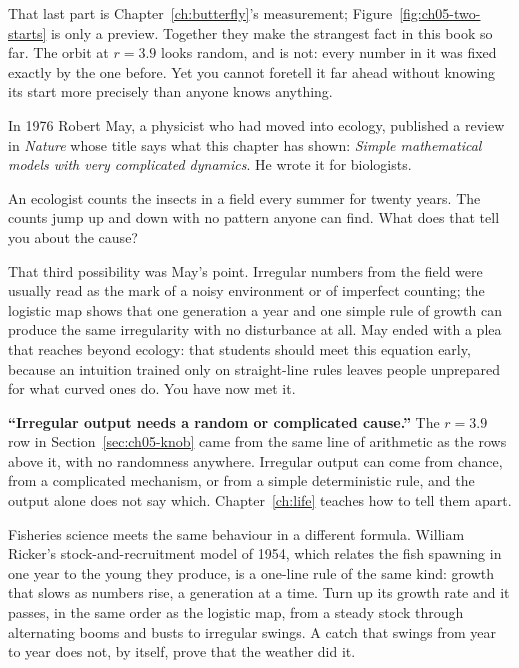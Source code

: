 \noindent
That last part is Chapter~\ref{ch:butterfly}'s measurement;
Figure~\ref{fig:ch05-two-starts} is only a preview. Together they make the strangest fact in this book so far. The
orbit at $r = \num{3.9}$ looks random, and is not: every number in it was
fixed exactly by the one before. Yet you cannot foretell it far ahead
without knowing its start more precisely than anyone knows anything.

In 1976 Robert May, a physicist who had moved into ecology, published a
review in \emph{Nature} whose title says what this chapter has shown:
\emph{Simple mathematical models with very complicated dynamics}. He wrote
it for biologists.

\begin{think}
An ecologist counts the insects in a field every summer for twenty years.
The counts jump up and down with no pattern anyone can find. What does that
tell you about the cause?
\end{think}

\noindent
That third possibility was May's point. Irregular numbers from the field
were usually read as the mark of a noisy environment or of imperfect
counting; the logistic map shows that one generation a year and one simple
rule of growth can produce the same irregularity with no disturbance at all.
May ended with a plea that reaches beyond ecology: that students should
meet this equation early, because an intuition trained only on straight-line
rules leaves people unprepared for what curved ones do. You have now met it.

\begin{trapbox}
\textbf{\enquote{Irregular output needs a random or complicated cause.}}
The $r = \num{3.9}$ row in Section~\ref{sec:ch05-knob} came from the same
line of arithmetic as the rows above it, with no randomness anywhere.
Irregular output can come from chance, from a complicated mechanism, or from
a simple deterministic rule, and the output alone does not say which.
Chapter~\ref{ch:life} teaches how to tell them apart.
\end{trapbox}

\begin{worldbox}
Fisheries science meets the same behaviour in a different formula. William
Ricker's stock-and-recruitment model of 1954, which relates the fish
spawning in one year to the young they produce, is a one-line rule of the
same kind: growth that slows as numbers rise, a generation at a time. Turn
up its growth rate and it passes, in the same order as the logistic map,
from a steady stock through alternating booms and busts to irregular swings.
A catch that swings from year to year does not, by itself, prove that the
weather did it.
\end{worldbox}


